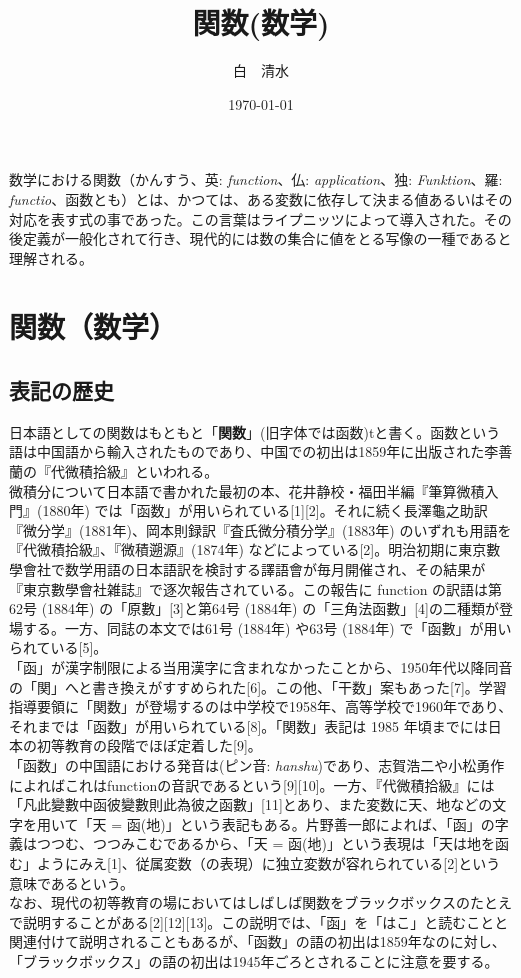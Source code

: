 \documentclass[a4j,12pt]{jreport}
\title{関数(数学)}
\author{白　清水}
\date{\today}
\begin{document}
\maketitle
数学における関数（かんすう、英: {\it function}、仏: {\it application}、独: {\it Funktion}、羅: {\it functio}、函数とも）とは、かつては、ある変数に依存して決まる値あるいはその対応を表す式の事であった。この言葉はライプニッツによって導入された。その後定義が一般化されて行き、現代的には数の集合に値をとる写像の一種であると理解される。

\tableofcontents

\chapter{関数（数学）}

\section{表記の歴史}
日本語としての関数はもともと「{\bf 関数}」(旧字体では函数)tと書く。函数という語は中国語から輸入されたものであり、中国での初出は1859年に出版された李善蘭の『代微積拾級』といわれる。\\
微積分について日本語で書かれた最初の本、花井静校・福田半編『筆算微積入門』(1880年) では「函数」が用いられている[1][2]。それに続く長澤龜之助訳『微分学』(1881年)、岡本則録訳『査氏微分積分学』(1883年) のいずれも用語を『代微積拾級』、『微積遡源』(1874年) などによっている[2]。明治初期に東京數學會社で数学用語の日本語訳を検討する譯語會が毎月開催され、その結果が『東京數學會社雑誌』で逐次報告されている。この報告に function の訳語は第62号 (1884年) の「原數」[3]と第64号 (1884年) の「三角法函數」[4]の二種類が登場する。一方、同誌の本文では61号 (1884年) や63号 (1884年) で「函數」が用いられている[5]。\\
「函」が漢字制限による当用漢字に含まれなかったことから、1950年代以降同音の「関」へと書き換えがすすめられた[6]。この他、「干数」案もあった[7]。学習指導要領に「関数」が登場するのは中学校で1958年、高等学校で1960年であり、それまでは「函数」が用いられている[8]。「関数」表記は 1985 年頃までには日本の初等教育の段階でほぼ定着した[9]。\\
「函数」の中国語における発音は(ピン音: {\it hanshu})であり、志賀浩二や小松勇作によればこれはfunctionの音訳であるという[9][10]。一方、『代微積拾級』には「凡此變數中函彼變數則此為彼之函數」[11]とあり、また変数に天、地などの文字を用いて「天 = 函(地)」という表記もある。片野善一郎によれば、「函」の字義はつつむ、つつみこむであるから、「天 = 函(地)」という表現は「天は地を函む」ようにみえ[1]、従属変数（の表現）に独立変数が容れられている[2]という意味であるという。\\
なお、現代の初等教育の場においてはしばしば関数をブラックボックスのたとえで説明することがある[2][12][13]。この説明では、「函」を「はこ」と読むことと関連付けて説明されることもあるが、「函数」の語の初出は1859年なのに対し、「ブラックボックス」の語の初出は1945年ごろとされることに注意を要する。\\
\end{document}
